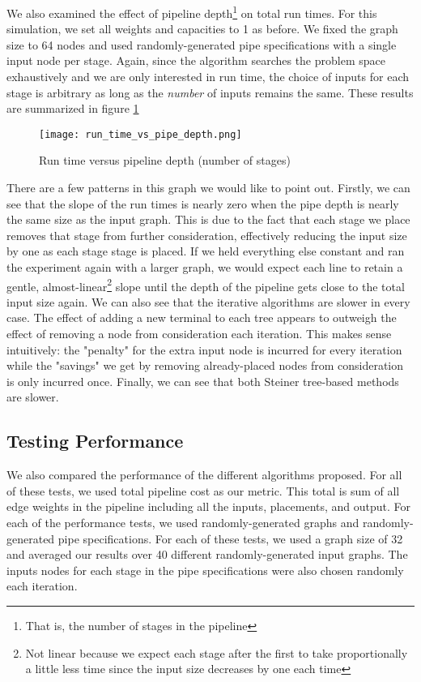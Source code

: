 \documentclass{acmart}
\begin{document}
	We also examined the effect of pipeline depth\footnote{That is, the number of stages in the pipeline} on total run times. For this simulation, we set all weights and capacities to 1 as before. We fixed the graph size to 64 nodes and used randomly-generated pipe specifications with a single input node per stage. Again, since the algorithm searches the problem space exhaustively and we are only interested in run time, the choice of inputs for each stage is arbitrary as long as the \textit{number} of inputs remains the same. These results are summarized in figure \ref{fig:pd_gs}
	\begin{figure}[H]
	    \centering
	    \texttt{[image: run\_time\_vs\_pipe\_depth.png]}
	    \caption{Run time versus pipeline depth (number of stages)}
	    \label{fig:pd_gs}
	\end{figure}
	There are a few patterns in this graph we would like to point out. Firstly, we can see that the slope of the run times is nearly zero when the pipe depth is nearly the same size as the input graph. This is due to the fact that each stage we place removes that stage from further consideration, effectively reducing the input size by one as each stage stage is placed. If we held everything else constant and ran the experiment again with a larger graph, we would expect each line to retain a gentle, almost-linear\footnote{Not linear because we expect each stage after the first to take proportionally a little less time since the input size decreases by one each time} slope until the depth of the pipeline gets close to the total input size again.
	We can also see that the iterative algorithms are slower in every case. The effect of adding a new terminal to each tree appears to outweigh the effect of removing a node from consideration each iteration. This makes sense intuitively: the "penalty" for the extra input node is incurred for every iteration while the "savings" we get by removing already-placed nodes from consideration is only incurred once. Finally, we can see that both Steiner tree-based methods are slower.
	
	\subsection{Testing Performance}
	We also compared the performance of the different algorithms proposed. For all of these tests, we used total pipeline cost as our metric. This total is sum of all edge weights in the pipeline including all the inputs, placements, and output. For each of the performance tests, we used randomly-generated graphs and randomly-generated pipe specifications. For each of these tests, we used a graph size of 32 and averaged our results over 40 different randomly-generated input graphs. The inputs nodes for each stage in the pipe specifications were also chosen randomly each iteration.
	
\end{document}
